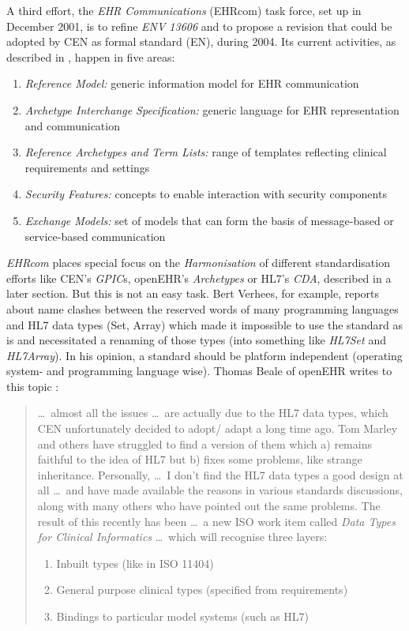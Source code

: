 A third effort, the \emph{EHR Communications} (EHRcom) task force, set up in
December 2001, is to refine \emph{ENV 13606} and to propose a revision that
could be adopted by CEN as formal standard (EN), during 2004. Its current
activities, as described in \cite{ehrcom}, happen in five areas:

\begin{enumerate}
    \item \emph{Reference Model:} generic information model for EHR
        communication
    \item \emph{Archetype Interchange Specification:} generic language for EHR
        representation and communication
    \item \emph{Reference Archetypes and Term Lists:} range of templates
        reflecting clinical requirements and settings
    \item \emph{Security Features:} concepts to enable interaction with
        security components
    \item \emph{Exchange Models:} set of models that can form the basis of
        message-based or service-based communication
\end{enumerate}

\emph{EHRcom} places special focus on the \emph{Harmonisation} of different
standardisation efforts \cite{kalra2002} like CEN's \emph{GPIC}s, openEHR's
\emph{Archetypes} or HL7's \emph{CDA}, described in a later section. But this
is not an easy task. Bert Verhees, for example, reports \cite{openehrtechnical}
about name clashes between the reserved words of many programming languages and
HL7 data types (Set, Array) which made it impossible to use the standard as is
and necessitated a renaming of those types (into something like \emph{HL7Set}
and \emph{HL7Array}). In his opinion, a standard should be platform independent
(operating system- and programming language wise). Thomas Beale of openEHR
writes to this topic \cite{openehrtechnical}:

\begin{quote}
    \ldots\ almost all the issues \ldots\ are actually due to the HL7 data
    types, which CEN unfortunately decided to adopt/ adapt a long time ago. Tom
    Marley and others have struggled to find a version of them which a) remains
    faithful to the idea of HL7 but b) fixes some problems, like strange
    inheritance. Personally, \ldots\ I don't find the HL7 data types a good
    design at all \ldots\ and have made available the reasons in various
    standards discussions, along with many others who have pointed out the same
    problems. The result of this recently has been \ldots\ a new ISO work item
    called \emph{Data Types for Clinical Informatics} \ldots\ which will
    recognise three layers:

    \begin{enumerate}
        \item Inbuilt types (like in ISO 11404)
        \item General purpose clinical types (specified from requirements)
        \item Bindings to particular model systems (such as HL7)
    \end{enumerate}
\end{quote}
